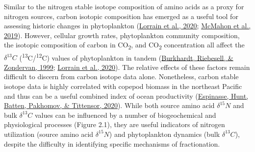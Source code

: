\documentclass [11pt, proquest] {uwthesis}[2015/03/03]
\begin{document}
Similar to the nitrogen stable isotope composition of amino acids as a proxy for nitrogen sources, carbon isotopic composition has emerged as a useful tool for assessing historic changes in phytoplankton (\protect\hyperlink{ref-Lorrain2020}{Lorrain et al., 2020}; \protect\hyperlink{ref-McMahon2019}{McMahon et al., 2019}). However, cellular growth rates, phytoplankton community composition, the isotopic composition of carbon in CO\textsubscript{2}, and CO\textsubscript{2} concentration all affect the \(\delta^{13}C\) (\textsuperscript{13}C/\textsuperscript{12}C) values of phytoplankton in tandem (\protect\hyperlink{ref-Burkhardt1999}{Burkhardt, Riebesell, \& Zondervan, 1999}; \protect\hyperlink{ref-Lorrain2020}{Lorrain et al., 2020}). The relative effects of these factors remain difficult to discern from carbon isotope data alone. Nonetheless, carbon stable isotope data is highly correlated with copepod biomass in the northeast Pacific and thus can be a useful combined index of ocean productivity (\protect\hyperlink{ref-Espinasse2020}{Espinasse, Hunt, Batten, Pakhomov, \& Tittensor, 2020}). While both source amino acid \(\delta^{15}N\) and bulk \(\delta^{13}C\) values can be influenced by a number of biogeochemical and physiological processes (Figure 2.1), they are useful indicators of nitrogen utilization (source amino acid \(\delta^{15}N\)) and phytoplankton dynamics (bulk \(\delta^{13}C\)), despite the difficulty in identifying specific mechanisms of fractionation.
\end{document}
